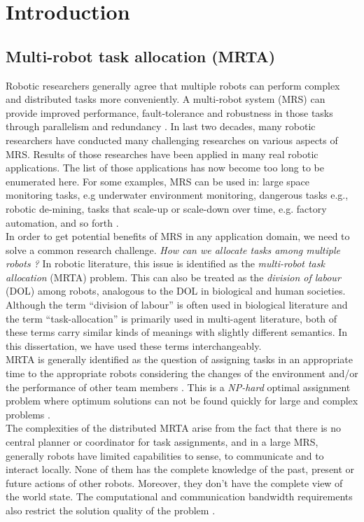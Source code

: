 \chapter{Introduction}
\section{Multi-robot task allocation (MRTA)}
Robotic researchers generally agree that multiple robots can perform complex and distributed tasks more conveniently. A multi-robot system (MRS) can provide improved performance, fault-tolerance and robustness in those tasks through parallelism and redundancy \cite{Arkin1998,Parker+2006,Mataric2007}. In last two decades, many robotic researchers have conducted many challenging researches on various aspects of MRS. Results of those researches have been applied   in many real robotic applications. The list of those applications has now become too long to be enumerated here. For some examples, MRS can be used in: large space monitoring tasks, e.g underwater environment monitoring, dangerous tasks e.g., robotic de-mining, tasks that scale-up or scale-down over time, e.g. factory automation, and so forth \cite{Sahin+2005}.\\
In order to get potential benefits of MRS in any application domain, we need to solve a common research challenge. \textit{How can we allocate tasks among multiple robots ?} In robotic literature,  this issue is identified as the \textit{multi-robot task allocation} (MRTA) problem. This can also be treated as the \textit{division of labour} (DOL) among robots, analogous to the DOL in biological  and human societies. Although the term ``division of labour'' is often used in biological literature and the term ``task-allocation'' is primarily used in multi-agent literature, both of these terms carry similar kinds of meanings with slightly different semantics. In this dissertation, we have used these terms interchangeably.\\
MRTA is generally identified as the question of assigning tasks in an appropriate time to the appropriate robots considering the changes of the environment and/or the performance of other team members \cite{Gerkey+2004}. This is a {\em NP-hard} optimal assignment problem where optimum solutions can not be found quickly for large and complex problems \cite{Parker2008}.\\
The complexities of the distributed MRTA arise from the fact that there is no central planner or coordinator for task assignments, and in a large MRS, generally robots have limited capabilities to sense, to communicate and to interact locally. None of them has the complete knowledge of the past, present or future actions of other robots. Moreover, they don't have the complete view of the world state. The computational and communication bandwidth requirements also restrict the solution quality of the problem \cite{Gerkey+2004}.\\
